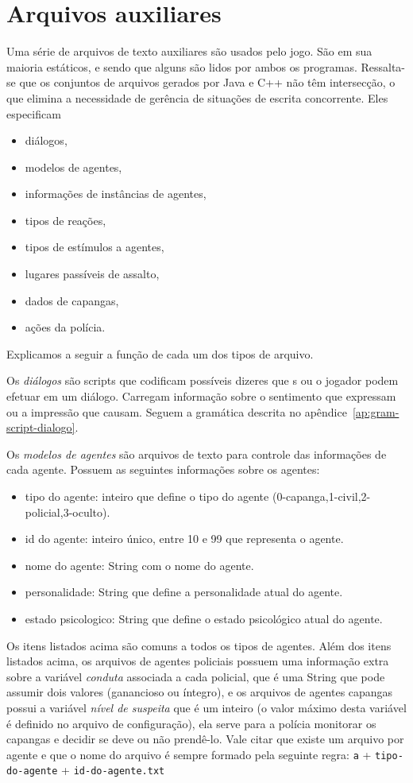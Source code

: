 \section{Arquivos auxiliares}

Uma série de arquivos de texto auxiliares são usados pelo
jogo. São em sua maioria estáticos, e sendo que alguns são lidos por ambos os programas. Ressalta-se que os conjuntos de arquivos gerados por Java e C++ não têm intersecção, o que elimina a necessidade de gerência de situações de escrita concorrente. Eles especificam
\begin{itemize}
\item diálogos,
\item modelos de agentes,
\item informações de instâncias de agentes,
\item tipos de reações,
\item tipos de estímulos a agentes,
\item lugares passíveis de assalto,
\item dados de capangas,
\item ações da polícia.
\end{itemize}

Explicamos a seguir a função de cada um dos tipos de arquivo.

Os \emph{diálogos} são scripts que codificam possíveis dizeres que
\npc{}s ou o jogador podem efetuar em um diálogo. Carregam informação sobre
o sentimento que expressam ou a impressão que causam. Seguem a
gramática descrita no apêndice~\ref{ap:gram-script-dialogo}.

Os \emph{modelos de agentes} são arquivos de texto para controle das informações de cada agente. Possuem as seguintes informações sobre os agentes:
\begin{itemize}
\item tipo do agente: inteiro que define o tipo do agente (0-capanga,1-civil,2-policial,3-oculto).
\item id do agente: inteiro único, entre 10 e 99 que representa o agente.
\item nome do agente: String com o nome do agente.
\item personalidade: String que define a personalidade atual do agente.
\item estado psicologico: String que define o estado psicológico atual do agente.
\end{itemize}
Os itens listados acima são comuns a todos os tipos de agentes.
Além dos itens listados acima, os arquivos de agentes policiais possuem uma informação extra sobre a variável \emph{conduta} associada a cada policial, que é uma String que pode assumir dois valores (ganancioso ou íntegro), e os arquivos de agentes capangas possui a variável \emph{nível de suspeita} que é um inteiro (o valor máximo desta variável é definido no arquivo de configuração), ela serve para a polícia monitorar os capangas e decidir se deve ou não prendê-lo.
Vale citar que existe um arquivo por agente e que o nome do arquivo é sempre formado pela seguinte regra: \verb!a! + \verb!tipo-do-agente! + \verb!id-do-agente.txt!

